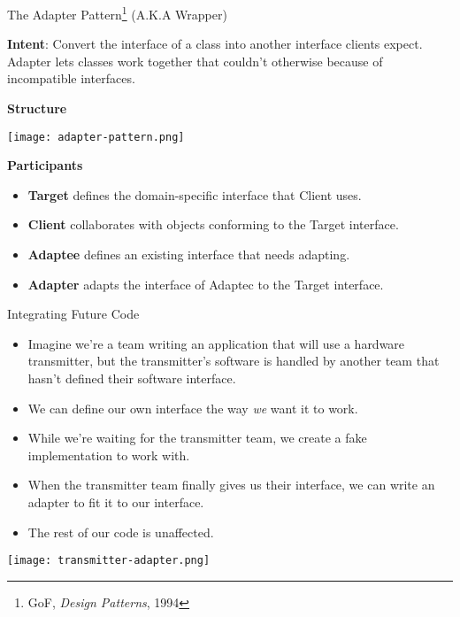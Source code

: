 \documentclass{beamer}
\begin{document}
\begin{frame}[fragile]{The Adapter Pattern\footnote{GoF, {\it Design Patterns}, 1994} (A.K.A Wrapper)}



{\bf Intent}: Convert the interface of a class into another interface clients expect. Adapter lets classes work together that couldn't otherwise because of incompatible interfaces.

{\bf Structure}
\vspace{-.05in}
\begin{center}
\texttt{[image: adapter-pattern.png]}\\
\end{center}
\vspace{-.125in}
{\bf Participants}
\begin{itemize}
\item {\bf Target} defines the domain-specific interface that Client uses.
\item {\bf Client} collaborates with objects conforming to the Target interface.
\item {\bf Adaptee} defines an existing interface that needs adapting.
\item {\bf Adapter} adapts the interface of Adaptec to the Target interface.
\end{itemize}


\end{frame}


\begin{frame}[fragile]{Integrating Future Code}

\begin{itemize}
\item Imagine we're a team writing an application that will use a hardware transmitter, but the transmitter's software is handled by another team that hasn't defined their software interface.
\item We can define our own interface the way {\it we} want it to work.
\item While we're waiting for the transmitter team, we create a fake implementation to work with.
\item When the transmitter team finally gives us their interface, we can write an adapter to fit it to our interface.
\item The rest of our code is unaffected.
\end{itemize}

\begin{center}
\texttt{[image: transmitter-adapter.png]}
\end{center}


\end{frame}
\end{document}
